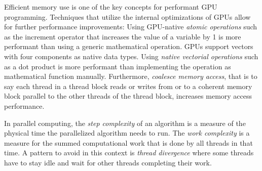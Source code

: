 Efficient memory use is one of the key concepts for performant GPU programming. Techniques that utilize the internal optimizations of GPUs allow for further performance improvements: Using GPU-native \textit{atomic operations} such as the increment operator that increases the value of a variable by 1 is more performant than using a generic mathematical operation. GPUs support vectors with four components as native data types. Using \textit{native vectorial operations} such as a dot product is more performant than implementing the operation as mathematical function manually. Furthermore, \textit{coalesce memory access}, that is to say each thread in a thread block reads or writes from or to a coherent memory block parallel to the other threads of the thread block, increases memory access performance. \cite{cudacourse}

In parallel computing, the \textit{step complexity} of an algorithm is a measure of the physical time the parallelized algorithm needs to run. The \textit{work complexity} is a measure for the summed computational work that is done by all threads in that time. A pattern to avoid in this context is \textit{thread divergence} where some threads have to stay idle and wait for other threads completing their work. \cite{cudacourse}
